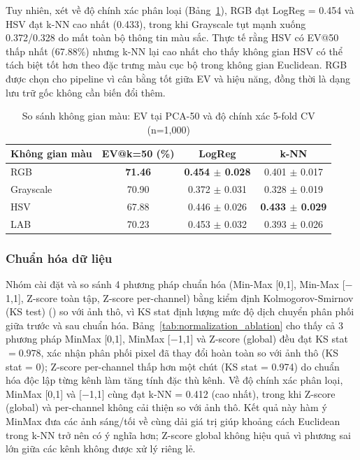 Tuy nhiên, xét về độ chính xác phân loại (Bảng~\ref{tab:colorspace_ablation}), RGB đạt LogReg = 0.454 và HSV đạt k-NN cao nhất (0.433), trong khi Grayscale tụt mạnh xuống 0.372/0.328 do mất toàn bộ thông tin màu sắc. Thực tế rằng HSV có EV@50 thấp nhất (67.88\%) nhưng k-NN lại cao nhất cho thấy không gian HSV có thể tách biệt tốt hơn theo đặc trưng màu cục bộ trong không gian Euclidean. RGB được chọn cho pipeline vì cân bằng tốt giữa EV và hiệu năng, đồng thời là dạng lưu trữ gốc không cần biến đổi thêm.
\begin{table}[H]
    \centering
    \begin{tabular}{|l|c|c|c|}
        \hline
        \textbf{Không gian màu} & \textbf{EV@k=50 (\%)} & \textbf{LogReg}            & \textbf{k-NN}              \\
        \hline
        RGB                     & \textbf{71.46}        & \textbf{0.454 $\pm$ 0.028} & 0.401 $\pm$ 0.017          \\
        \hline
        Grayscale               & 70.90                 & 0.372 $\pm$ 0.031          & 0.328 $\pm$ 0.019          \\
        \hline
        HSV                     & 67.88                 & 0.446 $\pm$ 0.026          & \textbf{0.433 $\pm$ 0.029} \\
        \hline
        LAB                     & 70.23                 & 0.453 $\pm$ 0.032          & 0.393 $\pm$ 0.026          \\
        \hline
    \end{tabular}
    \caption{So sánh không gian màu: EV tại PCA-50 và độ chính xác 5-fold CV (n=1{,}000)}
    \label{tab:colorspace_ablation}
\end{table}

\subsubsection{Chuẩn hóa dữ liệu}

Nhóm cài đặt và so sánh 4 phương pháp chuẩn hóa (Min-Max [0,1], Min-Max [$-$1,1], Z-score toàn tập, Z-score per-channel) bằng kiểm định Kolmogorov-Smirnov (KS test) (\cite{kolmogorov1933ks}) so với ảnh thô, vì KS stat định lượng mức độ dịch chuyển phân phối giữa trước và sau chuẩn hóa. Bảng~\ref{tab:normalization_ablation} cho thấy cả 3 phương pháp MinMax [0,1], MinMax [$-$1,1] và Z-score (global) đều đạt KS stat $= 0.978$, xác nhận phân phối pixel đã thay đổi hoàn toàn so với ảnh thô (KS stat = 0); Z-score per-channel thấp hơn một chút (KS stat = 0.974) do chuẩn hóa độc lập từng kênh làm tăng tính đặc thù kênh. Về độ chính xác phân loại, MinMax [0,1] và [$-$1,1] cùng đạt k-NN = 0.412 (cao nhất), trong khi Z-score (global) và per-channel không cải thiện so với ảnh thô. Kết quả này hàm ý MinMax đưa các ảnh sáng/tối về cùng dải giá trị giúp khoảng cách Euclidean trong k-NN trở nên có ý nghĩa hơn; Z-score global không hiệu quả vì phương sai lớn giữa các kênh không được xử lý riêng lẻ.

